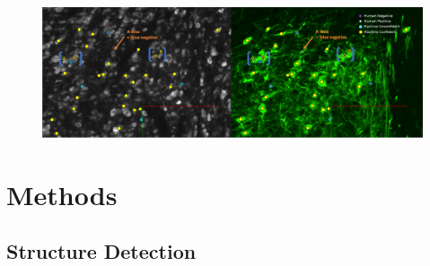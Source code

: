 \documentclass[11pt]{article}
\begin{document}
\begin{figure}[b]
  \includegraphics[width=\textwidth]{figures/Marked_cell_detections.png}
  \caption{}
\end{figure}

\newpage

\section{Methods}

\subsection{Structure Detection}
\end{document}
